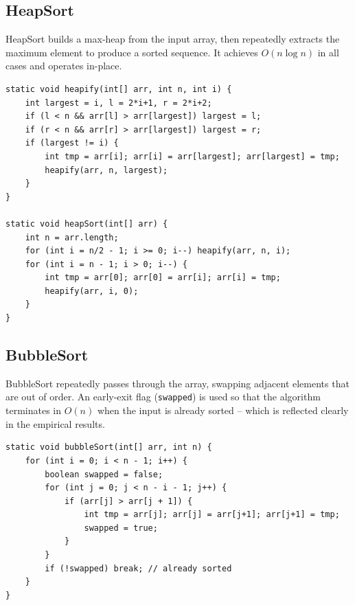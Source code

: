 \documentclass[12pt]{article}
\begin{document}
\subsection*{HeapSort}

\hspace{0.8cm} HeapSort builds a max-heap from the input array, then repeatedly extracts the maximum
element to produce a sorted sequence. It achieves $O(n \log n)$ in all cases and operates in-place.

\begin{lstlisting}[caption={HeapSort -- heapify and sort}, label={lst:hs}]
static void heapify(int[] arr, int n, int i) {
    int largest = i, l = 2*i+1, r = 2*i+2;
    if (l < n && arr[l] > arr[largest]) largest = l;
    if (r < n && arr[r] > arr[largest]) largest = r;
    if (largest != i) {
        int tmp = arr[i]; arr[i] = arr[largest]; arr[largest] = tmp;
        heapify(arr, n, largest);
    }
}

static void heapSort(int[] arr) {
    int n = arr.length;
    for (int i = n/2 - 1; i >= 0; i--) heapify(arr, n, i);
    for (int i = n - 1; i > 0; i--) {
        int tmp = arr[0]; arr[0] = arr[i]; arr[i] = tmp;
        heapify(arr, i, 0);
    }
}
\end{lstlisting}

\subsection*{BubbleSort}

\hspace{0.8cm} BubbleSort repeatedly passes through the array, swapping adjacent elements that are out
of order. An early-exit flag (\texttt{swapped}) is used so that the algorithm terminates in $O(n)$ when
the input is already sorted -- which is reflected clearly in the empirical results.

\begin{lstlisting}[caption={BubbleSort -- with early-exit optimization}, label={lst:bs}]
static void bubbleSort(int[] arr, int n) {
    for (int i = 0; i < n - 1; i++) {
        boolean swapped = false;
        for (int j = 0; j < n - i - 1; j++) {
            if (arr[j] > arr[j + 1]) {
                int tmp = arr[j]; arr[j] = arr[j+1]; arr[j+1] = tmp;
                swapped = true;
            }
        }
        if (!swapped) break; // already sorted
    }
}
\end{lstlisting}
\end{document}
